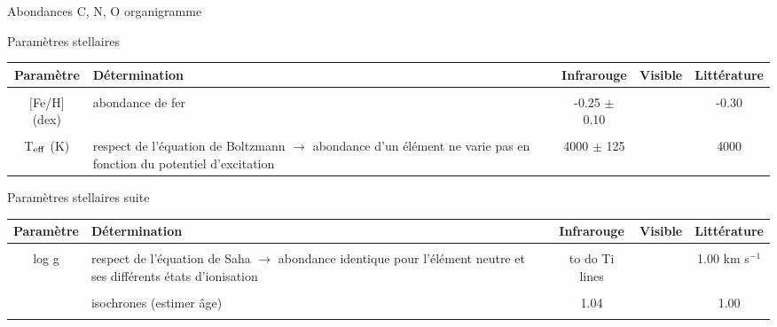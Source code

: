 \documentclass[10pt]{beamer}
\begin{document}
\begin{frame}[fragile]{Abondances C, N, O}
organigramme    
\end{frame}

\begin{frame}[fragile]{Paramètres stellaires}
\begin{table}[h!]
    \begin{center}
        \begin{tabularx}{\textwidth}{c|X|c|c|c}
            Paramètre & Détermination & Infrarouge &Visible& Littérature \\
            \hline
            &&&\\
            $[$Fe/H$]$ (dex)&  abondance de fer & -0.25 $\pm$ 0.10 & &-0.30 \\
            &&&\\
            T$_{\rm eff}$ (K) & respect de l'équation de Boltzmann $\rightarrow$  abondance d'un élément ne varie pas en fonction du potentiel d'excitation & 4000 $\pm$ 125   && 4000 \\
        \end{tabularx}
    \end{center}
\end{table}

\end{frame}

\begin{frame}[fragile]{Paramètres stellaires suite}
\begin{table}[h!]
    \begin{center}
        \begin{tabularx}{\textwidth}{c|X|c|c|c}
            Paramètre & Détermination & Infrarouge & Visible &Littérature \\
            \hline
            &&&\\
            log g & respect de l'équation de Saha  $\rightarrow$ abondance identique pour l'élément neutre et ses différents états d'ionisation & to do Ti lines && 1.00 km s$^{-1}$\\
            &&&\\
             & isochrones (estimer âge) & 1.04 && 1.00 \\
            &&&\\
        \end{tabularx}
    \end{center}
\end{table}

\end{frame}
\end{document}
